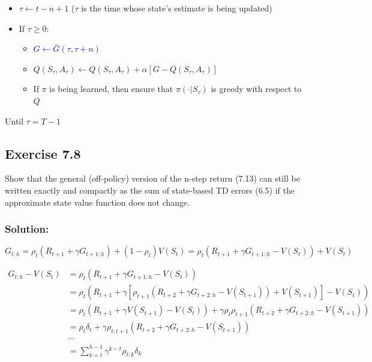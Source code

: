{\begin{minipage}{0.95\textwidth}
\begin{itemize}[left=0em]
\begin{itemize}[left=0em]
\begin{itemize}[left=0em]
            \item[] else:
            \begin{itemize}[left=0em]
                \item[] Select and store an action $A_{t+1} \sim b(\cdot | S_{t+1})$
            \end{itemize}
        \end{itemize}
        \item[] $\tau \leftarrow t - n + 1$ \hspace{1cm} ($\tau$ is the time whose state's estimate is being updated)
        \item[] If $\tau \geq 0$:
        \begin{itemize}[left=0em]
            \item[] \textcolor{blue}{$G \leftarrow \bar{G}(\tau, \tau+n)$}
            \item[] $Q(S_{\tau}, A_{\tau}) \leftarrow Q(S_{\tau}, A_{\tau}) + \alpha \left[ G - Q(S_{\tau}, A_{\tau}) \right]$
            \item[] If $\pi$ is being learned, then ensure that $\pi(\cdot | S_{\tau})$ is greedy with respect to $Q$
        \end{itemize}
    \end{itemize}
\end{itemize}
Until $\tau = T - 1$


\end{minipage}
}


\subsection*{Exercise 7.8}
Show that the general (off-policy) version of the n-step return (7.13) can
still be written exactly and compactly as the sum of state-based TD errors (6.5) if the
approximate state value function does not change.

\subsubsection*{Solution:}
\[
    G_{t:h} = \rho_t(R_{t+1} + \gamma G_{t+1:h}) + (1-\rho_t) V(S_t) = \rho_t(R_{t+1} + \gamma G_{t+1:h} - V(S_t)) + V(S_t)
\]

\begin{align*}
    G_{t:h} - V(S_t) &= \rho_t(R_{t+1} + \gamma G_{t+1:h} - V(S_t)) \\
    &= \rho_t \left(R_{t+1} + \gamma \left[\rho_{t+1}(R_{t+2} + \gamma G_{t+2:h} - V(S_{t+1})) + V(S_{t+1})\right]  - V(S_t) \right) \\
    &= \rho_t \left(R_{t+1} + \gamma V(S_{t+1})  - V(S_t) \right) + \gamma \rho_t \rho_{t+1}(R_{t+2} + \gamma G_{t+2:h} - V(S_{t+1}))\\
    &= \rho_t \delta_t + \gamma \rho_{t:t+1} (R_{t+2} + \gamma G_{t+2:h} - V(S_{t+1})) \\
    &\cdots \\
    &= \sum_{k=t}^{h-1} \gamma^{k-t} \rho_{t:k} \delta_k
\end{align*}


